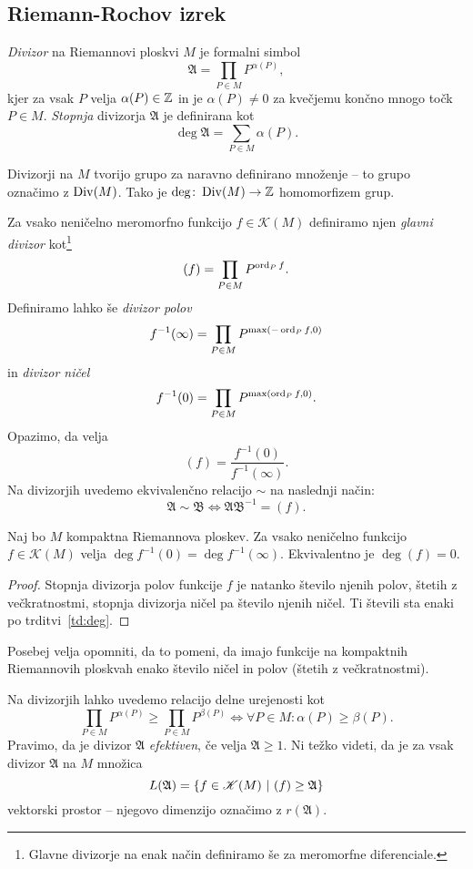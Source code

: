\subsection{Riemann-Rochov izrek}

\begin{definicija}
\emph{Divizor} na Riemannovi ploskvi $M$ je formalni simbol
\[
\mathfrak{A} = \prod_{P \in M} P^{\alpha(P)},
\]
kjer za vsak $P$ velja $\alpha(P) \in \mathbb{Z}$ in je $\alpha(P) \ne 0$
za kvečjemu končno mnogo točk $P \in M$. \emph{Stopnja} divizorja
$\mathfrak{A}$ je definirana kot
\[
\deg \mathfrak{A} = \sum_{P \in M} \alpha(P).
\]
\end{definicija}

Divizorji na $M$ tvorijo grupo za naravno definirano množenje --
to grupo označimo z $\operatorname{Div}(M)$. Tako je
$\deg \colon \operatorname{Div}(M) \to \mathbb{Z}$ homomorfizem grup.

Za vsako neničelno meromorfno funkcijo $f \in \mathscr{K}(M)$
definiramo njen \emph{glavni divizor} kot\footnote{Glavne divizorje
na enak način definiramo še za meromorfne diferenciale.}
\[
(f) = \prod_{P \in M} P^{\operatorname{ord}_P f}.
\]
Definiramo lahko še \emph{divizor polov}
\[
f^{-1}(\infty) = \prod_{P \in M} P^{\max(-\operatorname{ord}_P f, 0)}
\]
in \emph{divizor ničel}
\[
f^{-1}(0) = \prod_{P \in M} P^{\max(\operatorname{ord}_P f, 0)}.
\]
Opazimo, da velja
\[
(f) = \frac{f^{-1}(0)}{f^{-1}(\infty)}.
\]
Na divizorjih uvedemo ekvivalenčno relacijo $\sim$ na naslednji način:
\[
\mathfrak{A} \sim \mathfrak{B} \iff
\mathfrak{A} \mathfrak{B}^{-1} = (f).
\]

\begin{lema}
Naj bo $M$ kompaktna Riemannova ploskev. Za vsako neničelno
funkcijo $f \in \mathscr{K}(M)$ velja
$\deg f^{-1}(0) = \deg f^{-1}(\infty)$. Ekvivalentno je
$\deg (f) = 0$.
\end{lema}

\begin{proof}
Stopnja divizorja polov funkcije $f$ je natanko število njenih
polov, štetih z večkratnostmi, stopnja divizorja ničel pa
število njenih ničel. Ti števili sta enaki po
trditvi~\ref{td:deg}.
\end{proof}

Posebej velja opomniti, da to pomeni, da imajo funkcije na
kompaktnih Riemannovih ploskvah enako število ničel in polov
(štetih z večkratnostmi).

Na divizorjih lahko uvedemo relacijo delne urejenosti kot
\[
\prod_{P \in M} P^{\alpha(P)} \geq \prod_{P \in M} P^{\beta(P)}
\iff
\forall P \in M \colon \alpha(P) \geq \beta(P).
\]
Pravimo, da je divizor $\mathfrak{A}$ \emph{efektiven}, če velja
$\mathfrak{A} \geq 1$. Ni težko videti, da je za vsak divizor
$\mathfrak{A}$ na $M$ množica
\[
L(\mathfrak{A}) =
\left\{f \in \mathscr{K}(M)~\middle\vert~(f) \geq \mathfrak{A}\right\}
\]
vektorski prostor -- njegovo dimenzijo označimo z
$r(\mathfrak{A})$.

